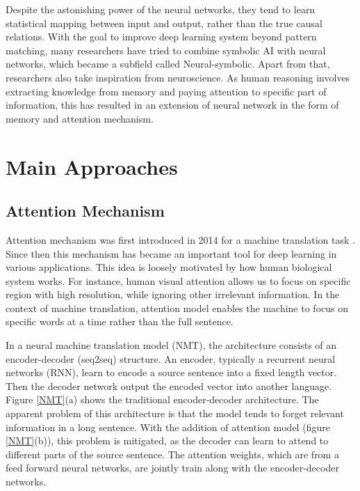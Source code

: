 \documentclass[journal]{IEEEtran}
\begin{document}
Despite the astonishing power of the neural networks, they tend to learn statistical mapping between input and output,
rather than the true causal relations. With the goal to improve deep learning system beyond pattern matching, many researchers have tried to combine symbolic AI with neural networks,
which became a subfield called Neural-symbolic. Apart from that, researchers also take inspiration from neuroscience. 
As human reasoning involves extracting knowledge from memory and paying attention to specific part of information, 
this has resulted in an extension of neural network in the form of memory and attention mechanism. 

\section{Main Approaches}
\subsection{Attention Mechanism}
Attention mechanism was first introduced in 2014 for a machine translation task \cite{bahdanau2014neural}.
Since then this mechanism has became an important tool for deep learning in various applications. 
This idea is loosely motivated by how human biological system works. For instance, human visual attention allows us to 
focus on specific region with high resolution, while ignoring other irrelevant information. 
In the context of machine translation, attention model enables the machine to focus on specific words at a time 
rather than the full sentence.

In a neural machine translation model (NMT), the architecture consists of an encoder-decoder (seq2seq) structure.
An encoder, typically a recurrent neural networks (RNN), learn to encode a source sentence into a fixed length vector.
Then the decoder network output the encoded vector into another language. Figure \ref{NMT}(a) shows the traditional encoder-decoder architecture.
The apparent problem of this architecture is that the model tends to forget relevant information in a long sentence.
With the addition of attention model (figure \ref{NMT}(b)), this problem is mitigated, 
as the decoder can learn to attend to different parts of the source sentence. 
The attention weights, which are from a feed forward neural networks, are jointly train along with the encoder-decoder networks.
\end{document}

